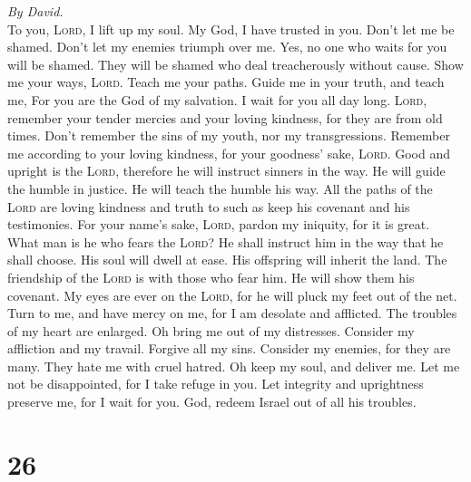 \emph{By David.}\\
 To you, \textsc{Lord}, I lift up my soul. 
My God, I have trusted in you. Don't let me be shamed. Don't let my
enemies triumph over me.  Yes, no one who waits for you
will be shamed. They will be shamed who deal treacherously without
cause.  Show me your ways, \textsc{Lord}. Teach me your
paths.  Guide me in your truth, and teach me, For you are
the God of my salvation. I wait for you all day long. 
\textsc{Lord}, remember your tender mercies and your loving kindness,
for they are from old times.  Don't remember the sins of
my youth, nor my transgressions. Remember me according to your loving
kindness, for your goodness' sake, \textsc{Lord}.  Good
and upright is the \textsc{Lord}, therefore he will instruct sinners in
the way.  He will guide the humble in justice. He will
teach the humble his way.  All the paths of the
\textsc{Lord} are loving kindness and truth to such as keep his covenant
and his testimonies.  For your name's sake,
\textsc{Lord}, pardon my iniquity, for it is great.  What
man is he who fears the \textsc{Lord}? He shall instruct him in the way
that he shall choose.  His soul will dwell at ease. His
offspring will inherit the land.  The friendship of the
\textsc{Lord} is with those who fear him. He will show them his
covenant.  My eyes are ever on the \textsc{Lord}, for he
will pluck my feet out of the net.  Turn to me, and have
mercy on me, for I am desolate and afflicted.  The
troubles of my heart are enlarged. Oh bring me out of my distresses.
 Consider my affliction and my travail. Forgive all my
sins.  Consider my enemies, for they are many. They hate
me with cruel hatred.  Oh keep my soul, and deliver me.
Let me not be disappointed, for I take refuge in you. 
Let integrity and uprightness preserve me, for I wait for you.
 God, redeem Israel out of all his troubles.

\hypertarget{section-25}{%
\section{26}\label{section-25}}

